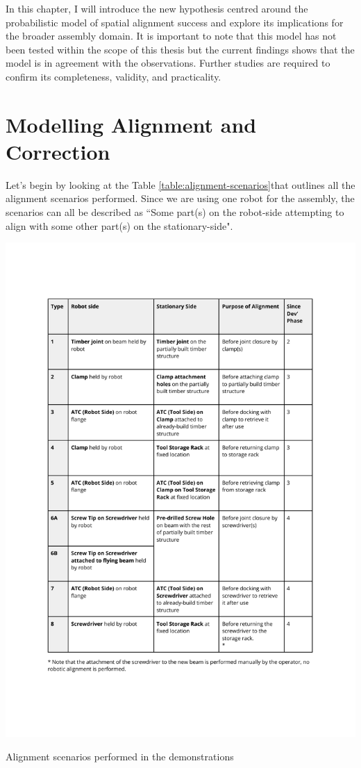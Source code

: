 In this chapter, I will introduce the new hypothesis centred around the probabilistic model of spatial alignment success and explore its implications for the broader assembly domain. It is important to note that this model has not been tested within the scope of this thesis but the current findings shows that the model is in agreement with the observations. Further studies are required to confirm its completeness, validity, and practicality. 

\section{Modelling Alignment and Correction}
\label{section:new-hypo-modelling-alignment-correction}

Let's begin by looking at the Table \ref{table:alignment-scenarios}that outlines all the alignment scenarios performed. Since we are using one robot for the assembly, the scenarios can all be described as ``Some part(s) on the robot-side attempting to align with some other part(s) on the stationary-side". 

\begin{table}
    \includegraphics[page=1, trim=25.4mm 35mm 25.4mm 33mm, clip, width=\textwidth]{tables/Tables in Chapter 9 to 11.pdf}
    \caption{Alignment scenarios performed in the demonstrations}
    \label{table:alignment-scenarios}
\end{table}

